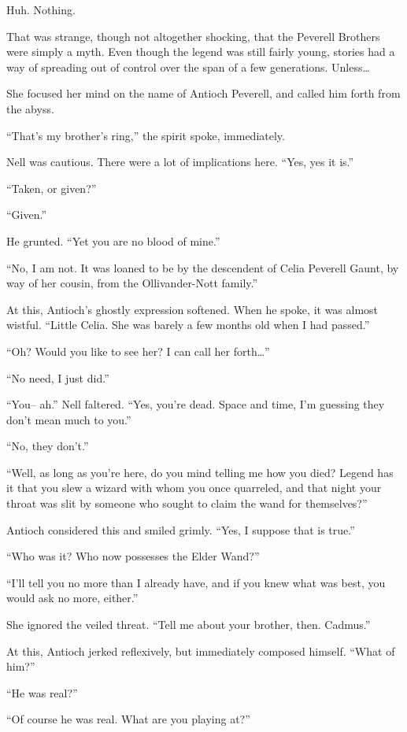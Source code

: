Huh. Nothing.

That was strange, though not altogether shocking, that the Peverell Brothers were simply a myth. Even though the legend was still fairly young, stories had a way of spreading out of control over the span of a few generations. Unless…

She focused her mind on the name of Antioch Peverell, and called him forth from the abyss.

“That’s my brother’s ring,” the spirit spoke, immediately.

Nell was cautious. There were a lot of implications here. “Yes, yes it is.”

“Taken, or given?”

“Given.”

He grunted. “Yet you are no blood of mine.”

“No, I am not. It was loaned to be by the descendent of Celia Peverell Gaunt, by way of her cousin, from the Ollivander-Nott family.”

At this, Antioch’s ghostly expression softened. When he spoke, it was almost wistful. “Little Celia. She was barely a few months old when I had passed.”

“Oh? Would you like to see her? I can call her forth…”

“No need, I just did.”

“You– ah.” Nell faltered. “Yes, you’re dead. Space and time, I’m guessing they don’t mean much to you.”

“No, they don’t.”

“Well, as long as you’re here, do you mind telling me how you died? Legend has it that you slew a wizard with whom you once quarreled, and that night your throat was slit by someone who sought to claim the wand for themselves?”

Antioch considered this and smiled grimly. “Yes, I suppose that is true.”

“Who was it? Who now possesses the Elder Wand?”

“I’ll tell you no more than I already have, and if you knew what was best, you would ask no more, either.”

She ignored the veiled threat. “Tell me about your brother, then. Cadmus.”

At this, Antioch jerked reflexively, but immediately composed himself. “What of him?”

“He was real?”

“Of course he was real. What are you playing at?”

